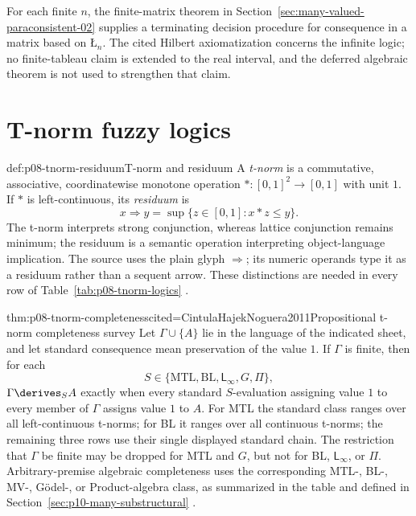 For each finite \(n\), the finite-matrix theorem in Section~\ref{sec:many-valued-paraconsistent-02} supplies a
terminating decision procedure for consequence in a matrix based on
\(\text{\L}_n\).  The cited
Hilbert axiomatization concerns the infinite logic; no finite-tableau claim is
extended to the real interval, and the deferred algebraic theorem is not used
to strengthen that claim.

\section{T-norm fuzzy logics}

\begin{hbdefinition}{def:p08-tnorm-residuum}{T-norm and residuum}
A \emph{t-norm} is a commutative, associative, coordinatewise monotone
operation \(\ast:[0,1]^2\to[0,1]\) with unit \(1\).  If \(\ast\) is
left-continuous, its \emph{residuum} is
\[
  x\Rightarrow y
  =\sup\{z\in[0,1]:x\ast z\leq y\}.
\]
The t-norm interprets strong conjunction, whereas lattice conjunction remains
minimum; the residuum is a semantic operation interpreting object-language
implication.  The source uses the plain glyph \(\Rightarrow\); its numeric
operands type it as a residuum rather than a sequent arrow.  These distinctions
are needed in every row of Table~\ref{tab:p08-tnorm-logics}
\cite{Hajek1998,CintulaHajekNoguera2011}.
\end{hbdefinition}

\begin{hbtheorem}{thm:p08-tnorm-completeness}{cited=CintulaHajekNoguera2011}{Propositional t-norm completeness survey}
Let \(\Gamma\cup\{A\}\) lie in the language of the indicated sheet, and let
standard consequence mean preservation of the value \(1\).  If \(\Gamma\) is
finite, then for each
\[
 S\in\{\mathrm{MTL},\mathrm{BL},\mathsf L_{\infty},G,\Pi\},
\]
\(\Gamma\derives_S A\) exactly when every standard \(S\)-evaluation assigning
value \(1\) to every member of \(\Gamma\) assigns value \(1\) to \(A\).
For MTL the standard class ranges over all left-continuous t-norms; for BL it
ranges over all continuous t-norms; the remaining three rows use their single
displayed standard chain.  The restriction that \(\Gamma\) be finite may be
dropped for MTL and \(G\), but not for BL, \(\mathsf L_{\infty}\), or
\(\Pi\).  Arbitrary-premise algebraic completeness uses the corresponding
MTL-, BL-, MV-, G\"odel-, or Product-algebra class, as summarized in the table
and defined in Section~\ref{sec:p10-many-substructural}
\cite{Hajek1998,CignoliEstevaGodoTorrens2000,JeneiMontagna2002}.
\end{hbtheorem}

